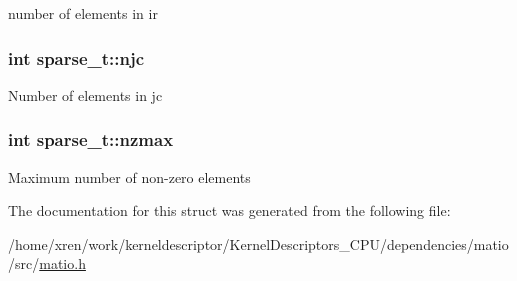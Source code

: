 \label{structsparse__t_a6aa1a08cc2760a36771edd65df8cf111}
number of elements in ir \hypertarget{structsparse__t_aa0ef6a0c8be3ad0e3a222371e68f7dd4}{
\subsubsection[{njc}]{\setlength{\rightskip}{0pt plus 5cm}int {\bf sparse\_\-t::njc}}}
\label{structsparse__t_aa0ef6a0c8be3ad0e3a222371e68f7dd4}
Number of elements in jc \hypertarget{structsparse__t_afd116055ad6a18c27b80333fdac45827}{
\subsubsection[{nzmax}]{\setlength{\rightskip}{0pt plus 5cm}int {\bf sparse\_\-t::nzmax}}}
\label{structsparse__t_afd116055ad6a18c27b80333fdac45827}
Maximum number of non-\/zero elements 

The documentation for this struct was generated from the following file:\begin{DoxyCompactItemize}
\item 
/home/xren/work/kerneldescriptor/KernelDescriptors\_\-CPU/dependencies/matio/src/\hyperlink{matio_8h}{matio.h}\end{DoxyCompactItemize}
